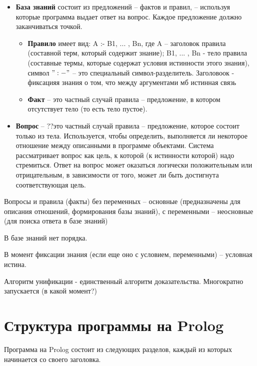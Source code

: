 \documentclass[12pt]{report}
\begin{document}
\begin{itemize}
	\item \textbf{База знаний} состоит из предложений -- фактов и правил, -- используя которые программа выдает ответ на вопрос. Каждое предложение  должно заканчиваться точкой.
	\begin{itemize}
		\item \textbf{Правило} имеет вид: A :- B1, ... , Bn, где A -- заголовок правила (составной терм, который содержит знание); B1, ... , Bn - тело правила (составные термы, которые содержат условия истинности этого знания), символ $":-"$ -- это специальный символ-разделитель. Заголовоок - фиксацияя знания о том, что между аргументами мб истинная связь
		\item \textbf{Факт} -- это частный случай правила -- предложение, в котором отсутствует тело (то есть тело пустое).
	\end{itemize}
	\item \textbf{Вопрос} -- ??это частный случай правила -- предложение, которое состоит только из тела. Используется, чтобы определить, выполняется ли некоторое отношение между описанными в программе объектами. Система рассматривает вопрос как цель, к которой (к истинности которой) надо стремиться. Ответ на вопрос может оказаться логически положительным или отрицательным, в зависимости от того, может ли быть достигнута соответствующая цель.
\end{itemize}

Вопросы и правила (факты) без переменных -- основные (предназначены для описания отношений, формирования базы знаний), с переменными -- неосновные (для поиска ответа в базе знаний)


В базе знаний нет порядка.

В момент фиксации знания (если еще оно с условием, переменными)  --  условная истина.


Алгоритм унификации - единственный алгоритм доказательства. Многократно запускается (в какой момент?)










\section{Структура программы на Prolog}

Программа на Prolog состоит из следующих разделов, каждый из которых начинается со своего заголовка.
\end{document}
